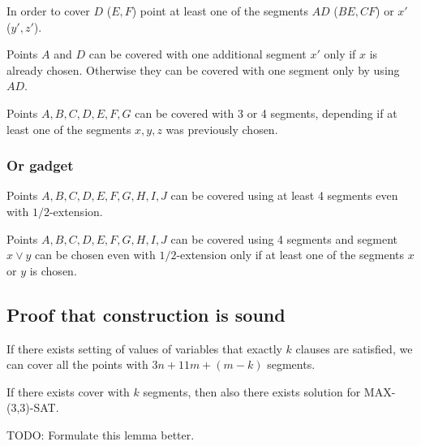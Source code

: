\begin{lemma}
In order to cover $D$ ($E, F$) point at least one
of the segments $AD$ ($BE, CF$) or $x'$ ($y', z'$).
\end{lemma}

\begin{lemma}
Points $A$ and $D$ can be covered
with one additional segment $x'$
only if $x$ is already chosen.
Otherwise they can be covered with one segment
only by using $AD$.
\end{lemma}

\begin{lemma}
Points $A, B, C, D, E, F, G$ can be covered with 
3 or 4 segments, depending if at least one of the segments
$x, y, z$ was previously chosen.
\end{lemma}

\subsubsection{Or gadget}
\begin{lemma}
Points $A, B, C, D, E, F, G, H, I, J$ can be covered using
at least 4 segments even with $1/2$-extension.
\end{lemma}

\begin{lemma}
Points $A, B, C, D, E, F, G, H, I, J$ can be covered using
4 segments and segment $x \lor y$ can be chosen
even with $1/2$-extension
only if at least one of the segments $x$ or $y$ is chosen.
\end{lemma}

\subsection{Proof that construction is sound}
\begin{lemma}
If there exists setting of values of variables that exactly $k$
clauses are satisfied, we can cover all the points
with $3n + 11m + (m-k)$ segments.
\end{lemma}

\begin{lemma}
If there exists cover with $k$ segments,
then also there exists solution for MAX-(3,3)-SAT.

TODO: Formulate this lemma better.
\end{lemma}

